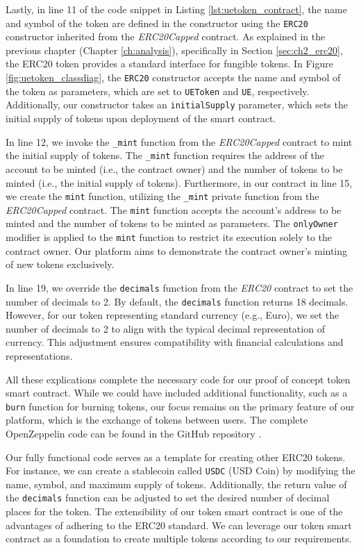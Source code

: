 Lastly, in line 11 of the code snippet in Listing \ref{lst:uetoken_contract}, the name and symbol of the token are defined in the constructor 
using the \texttt{ERC20} constructor inherited from the \textit{ERC20Capped} contract. As explained
 in the previous chapter (Chapter \ref{ch:analysis}), specifically in Section \ref{sec:ch2_erc20}, 
 the ERC20 token provides a standard interface for fungible tokens. In Figure \ref{fig:uetoken_classdiag}, the \texttt{ERC20} constructor accepts the name and symbol of the token as parameters, which are set to \texttt{UEToken} and \texttt{UE}, respectively. Additionally, our constructor takes an \texttt{initialSupply} parameter, which sets the initial supply of tokens upon deployment of the smart contract.

In line 12, we invoke the \texttt{\_mint} function from the \textit{ERC20Capped} contract to mint the initial supply of tokens. The \texttt{\_mint} function requires the address of the account to be minted (i.e., the contract owner) and the number of tokens to be minted (i.e., the initial supply of tokens). Furthermore, in our contract in line 15, we create the \texttt{mint} function, utilizing the \texttt{\_mint} private function from the \textit{ERC20Capped} contract. The \texttt{mint} function accepts the account's address to be minted and the number of tokens to be minted as parameters. The \texttt{onlyOwner} modifier is applied to the \texttt{mint} function to restrict its execution solely to the contract owner. Our platform aims to demonstrate the contract owner's minting of new tokens exclusively.

In line 19, we override the \texttt{decimals} function from the \textit{ERC20} contract to set the number of decimals to 2. By default, the \texttt{decimals} function returns 18 decimals. However, for our token representing standard currency (e.g., Euro), we set the number of decimals to 2 to align with the typical decimal representation of currency. This adjustment ensures compatibility with financial calculations and representations. 

All these explications complete the necessary code for our proof of concept token smart contract. While we could have included additional functionality, such as a \texttt{burn} function for burning tokens, our focus remains on the primary feature of our platform, which is the exchange of tokens between users. The complete OpenZeppelin code can be found in the GitHub repository \cite{openzeppelin_github}.

Our fully functional code serves as a template for creating other ERC20 tokens. For instance, we can create a stablecoin called \texttt{USDC} (USD Coin) by modifying the name, symbol, and maximum supply of tokens. Additionally, the return value of the \texttt{decimals} function can be adjusted to set the desired number of decimal places for the token. The extensibility of our token smart contract is one of the advantages of adhering to the ERC20 standard. We can leverage our token smart contract as a foundation to create multiple tokens according to our requirements.


